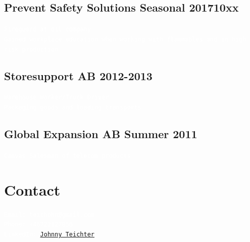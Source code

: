 \documentclass[12pt, letterpaper]{article}
\begin{document}
    \subsection{Prevent Safety Solutions Seasonal 201710xx}\label{subsec:job4}
      \texttt{\textcolor{white}{Fireguard at oil company \\
      Gained workplace education when working with flammables and in high risk production
      }}
    \subsection{Storesupport AB 2012-2013}\label{subsec:job5}
      \texttt{\textcolor{white}{Warehouse Worker/Truck Driver \\
      Packaging goods and loading transports
      }}
    \subsection{Global Expansion AB Summer 2011}\label{subsec:job6}
      \texttt{\textcolor{white}{Canvas Salesman of telecom products
      }}

    \section{Contact}\label{sec:contact}
      \texttt{\textcolor{white}{Email: teichohn@gmail.com \\ Phone: +46722127856 \\ LinkedIn:
      \href{https://www.linkedin.com/in/johnny-teichter/}{Johnny Teichter}
}}
\end{document}
